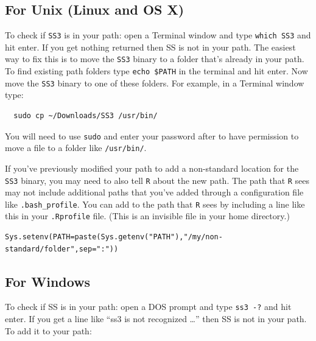 \documentclass[12pt]{article}
\begin{document}
\subsection{For Unix (Linux and OS X)}
To check if \texttt{SS3} is in your path: open a Terminal window and type 
\texttt{which SS3} and hit enter. If you get nothing returned then SS is not in 
your path. The easiest way to fix this is to move the \texttt{SS3} binary to a 
folder that's already in your path. To find existing path folders type 
\texttt{echo \$PATH} in the terminal and hit enter. Now move the \texttt{SS3} 
binary to one of these folders. For example, in a Terminal window type:

\begin{verbatim}
  sudo cp ~/Downloads/SS3 /usr/bin/
\end{verbatim}

\noindent
You will need to use \texttt{sudo} and enter your password after to have 
permission to move a file to a folder like \texttt{/usr/bin/}.

If you've previously modified your path to add a non-standard location for the 
\texttt{SS3} binary, you may need to also tell \texttt{R} about the new path. 
The path that \texttt{R} sees may not include additional paths that you've 
added through a configuration file like \texttt{.bash\_profile}. You can add to 
the path that \texttt{R} sees by including a line like this in your 
\texttt{.Rprofile} file. (This is an invisible file in your home directory.)

\begin{verbatim}
Sys.setenv(PATH=paste(Sys.getenv("PATH"),"/my/non-standard/folder",sep=":")) 
\end{verbatim}

\subsection{For Windows}
To check if SS is in your path: open a DOS prompt and type \texttt{ss3 -?} and 
hit enter. If you get a line like ``ss3 is not recognized \ldots'' then SS is 
not in your path. To add it to your path:
\end{document}
